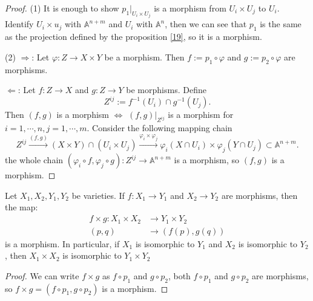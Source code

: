 \begin{proof}
	(1) It is enough to show $ p_1|_{U_i\times U_j} $ is a morphism from $ U_i\times U_j $ to $ U_i $. Identify $ U_i\times u_j $ with $ \mathbb{A}^{n+m} $ and $ U_i $ with $ \mathbb{A}^{n} $, then we can see that $ p_1 $ is the same as  the projection defined by the proposition \ref{19}, so it is a morphism.

	(2) $ \Rightarrow $: Let $ \varphi:Z\to X\times Y $ be a morphism. Then $ f:=p_1\circ \varphi $ and $ g:=p_2\circ \varphi $ are morphisms.

	$ \Leftarrow $: Let $ f:Z\to X $ and $ g:Z\to Y $ be morphisms. Define
	$$
		Z^{ij}:=f^{-1}(U_i)\cap g^{-1}(U_j).
	$$
	Then $ (f,g) $ is a morphism $ \Leftrightarrow $ $ (f,g)|_{Z^{ij}} $ is a morphism for $ i=1,\cdots,n,j=1,\cdots,m $. Consider the following mapping chain
	$$
		Z^{ij}\xrightarrow{(f,g)} (X\times Y)\cap (U_i\times U_j)\xrightarrow{\varphi_i\times \varphi_j}\varphi_i(X\cap U_i)\times \varphi_j(Y\cap U_j)\subset \mathbb{A}^{n+m}.
	$$
	the whole chain $ (\varphi_i\circ f,\varphi_j\circ g):Z^{ij}\to \mathbb{A}^{n+m} $ is a morphism, so $ (f,g) $ is a morphism.
\end{proof}
\begin{corollary}
	Let $ X_1,X_2,Y_1,Y_2 $ be varieties. If $ f:X_1\to Y_1 $ and $ X_2\to Y_2 $ are morphisms, then the map:
	\begin{align*}
		f\times g :X_1\times X_2 & \to Y_1\times Y_2 \\
		(p,q)                    & \to (f(p),g(q))
	\end{align*}
	is a morphism. In particular, if $ X_1 $ is isomorphic to $ Y_1 $ and $ X_2 $ is isomorphic to $ Y_2 $, then $ X_1\times X_2 $ is isomorphic to $ Y_1\times Y_2 $
\end{corollary}
\begin{proof}
	We can write $ f\times g $ as $ f\circ p_1 $ and $ g\circ p_2 $, both $ f\circ p_1 $ and $ g\circ p_2 $ are morphisms, so $ f\times g =(f\circ p_1,g\circ p_2) $ is a morphism.
\end{proof}

